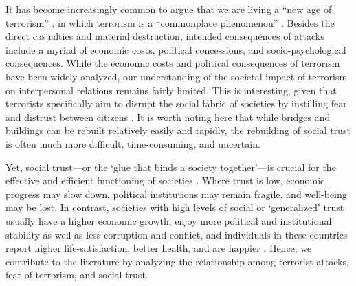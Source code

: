 It has become increasingly common to argue that we are living a ``new age of terrorism'' \citep{Jenkins2006}, in which terrorism is a ``commonplace phenomenon'' \citep{Blomberg2011}. Besides the direct casualties and material destruction, intended consequences of attacks include a myriad of economic costs, political concessions, and socio-psychological consequences. While the economic costs \citep[e.g.,][]{Arce2011, Sandler2011} and political consequences \citep[e.g.,][]{Alonso2013a, Montalvo2011, Sandler1995, Wilkinson1986} of terrorism have been widely analyzed, our understanding of the societal impact of terrorism on interpersonal relations remains fairly limited. This is interesting, given that terrorists specifically aim to disrupt the social fabric of societies by instilling fear and distrust between citizens \citep{Bakker2012, Konty2004}. It is worth noting here that while bridges and buildings can be rebuilt relatively easily and rapidly, the rebuilding of social trust is often much more difficult, time-consuming, and uncertain.


Yet, social trust—or the `glue that binds a society together'—is crucial for the effective and efficient functioning of societies \citep{Fukuyama1995, Putnam2000}. Where trust is low, economic progress may slow down, political institutions may remain fragile, and well-being may be lost. In contrast, societies with high levels of social or `generalized' trust usually have a higher economic growth, enjoy more political and institutional stability as well as less corruption and conflict, and individuals in these countries report higher life-satisfaction, better health, and are happier \citep[e.g.,][]{Bjrnskov2012, Delhey2015, Foa2011, Helliwell2004, Klein2013, Knack1997}. Hence, we contribute to the literature by analyzing the relationship among terrorist attacks, fear of terrorism, and social trust.


